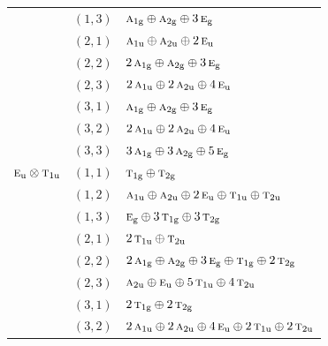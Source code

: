 \documentclass[11pt]{article}
\newcommand{\irr}[1]{\text{\normalfont\scshape #1}}
\newcommand{\ptag}[1]{\mathrm{#1}}
\begin{document}
\begin{longtable}{p{} c p{}}
 & $(1,3)$ & $\irr{a}_{1\ptag{g}}\oplus \irr{a}_{2\ptag{g}}\oplus 3\,\irr{e}_{\ptag{g}}$\\

 & $(2,1)$ & $\irr{a}_{1\ptag{u}}\oplus \irr{a}_{2\ptag{u}}\oplus 2\,\irr{e}_{\ptag{u}}$\\

 & $(2,2)$ & $2\,\irr{a}_{1\ptag{g}}\oplus \irr{a}_{2\ptag{g}}\oplus 3\,\irr{e}_{\ptag{g}}$\\

 & $(2,3)$ & $2\,\irr{a}_{1\ptag{u}}\oplus 2\,\irr{a}_{2\ptag{u}}\oplus 4\,\irr{e}_{\ptag{u}}$\\

 & $(3,1)$ & $\irr{a}_{1\ptag{g}}\oplus \irr{a}_{2\ptag{g}}\oplus 3\,\irr{e}_{\ptag{g}}$\\

 & $(3,2)$ & $2\,\irr{a}_{1\ptag{u}}\oplus 2\,\irr{a}_{2\ptag{u}}\oplus 4\,\irr{e}_{\ptag{u}}$\\

 & $(3,3)$ & $3\,\irr{a}_{1\ptag{g}}\oplus 3\,\irr{a}_{2\ptag{g}}\oplus 5\,\irr{e}_{\ptag{g}}$\\

\hline

$\irr{e}_{\ptag{u}}\otimes \irr{t}_{1\ptag{u}}$ & $(1,1)$ & $\irr{t}_{1\ptag{g}}\oplus \irr{t}_{2\ptag{g}}$\\

 & $(1,2)$ & $\irr{a}_{1\ptag{u}}\oplus \irr{a}_{2\ptag{u}}\oplus 2\,\irr{e}_{\ptag{u}}\oplus \irr{t}_{1\ptag{u}}\oplus \irr{t}_{2\ptag{u}}$\\

 & $(1,3)$ & $\irr{e}_{\ptag{g}}\oplus 3\,\irr{t}_{1\ptag{g}}\oplus 3\,\irr{t}_{2\ptag{g}}$\\

 & $(2,1)$ & $2\,\irr{t}_{1\ptag{u}}\oplus \irr{t}_{2\ptag{u}}$\\

 & $(2,2)$ & $2\,\irr{a}_{1\ptag{g}}\oplus \irr{a}_{2\ptag{g}}\oplus 3\,\irr{e}_{\ptag{g}}\oplus \irr{t}_{1\ptag{g}}\oplus 2\,\irr{t}_{2\ptag{g}}$\\

 & $(2,3)$ & $\irr{a}_{2\ptag{u}}\oplus \irr{e}_{\ptag{u}}\oplus 5\,\irr{t}_{1\ptag{u}}\oplus 4\,\irr{t}_{2\ptag{u}}$\\

 & $(3,1)$ & $2\,\irr{t}_{1\ptag{g}}\oplus 2\,\irr{t}_{2\ptag{g}}$\\

 & $(3,2)$ & $2\,\irr{a}_{1\ptag{u}}\oplus 2\,\irr{a}_{2\ptag{u}}\oplus 4\,\irr{e}_{\ptag{u}}\oplus 2\,\irr{t}_{1\ptag{u}}\oplus 2\,\irr{t}_{2\ptag{u}}$\\


\end{longtable}
\end{document}
